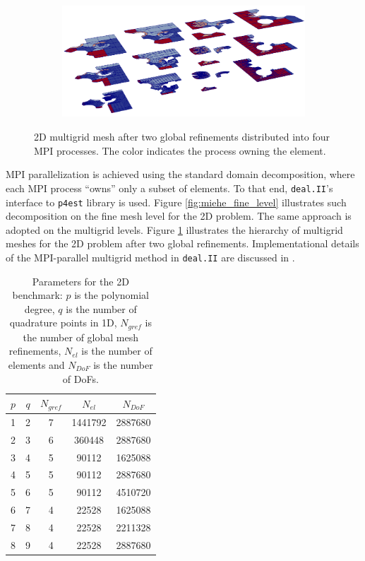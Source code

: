 \documentclass[times,doublespace]{nmeauth}
\begin{document}
\begin{figure}[!ht]
  \centering
  \begin{subfigure}[b]{0.8\textwidth}
    \centering
    \includegraphics[width=\textwidth]{gmg_2d_4procs.png}
  \end{subfigure}
  \caption{2D multigrid mesh after two global refinements distributed into four MPI processes. The color indicates the process owning the element.}%
  \label{fig:miehe_gmg}
\end{figure}
%
%
{\color{red}
MPI parallelization is achieved using the standard domain decomposition, where each MPI process ``owns'' only a subset of elements.
To that end, \texttt{deal.II}'s interface to \texttt{p4est} \cite{p4est} library is used.
Figure \ref{fig:miehe_fine_level} illustrates such decomposition on the fine mesh level for the 2D problem.
The same approach is adopted on the multigrid levels.}
Figure \ref{fig:miehe_gmg} illustrates the hierarchy of multigrid meshes for the 2D problem after two global refinements.
{\color{red}
Implementational details of the MPI-parallel multigrid method in \texttt{deal.II} are discussed in \cite{Clevenger2018}.
}

\begin{table}
  \centering
  \begin{tabular}{ccccc}
  \hline
    $p$ & $q$ & $N_{gref}$ & $N_{el}$ & $N_{DoF}$ \\
  \hline
    1 & 2 & 7 & 1441792 & 2887680 \\
    2 & 3 & 6 & 360448 & 2887680 \\
    3 & 4 & 5 & 90112 & 1625088 \\
    4 & 5 & 5 & 90112 & 2887680 \\
    5 & 6 & 5 & 90112 & 4510720 \\
    6 & 7 & 4 & 22528 & 1625088 \\
    7 & 8 & 4 & 22528 & 2211328 \\
    8 & 9 & 4 & 22528 & 2887680 \\
  \hline
  \end{tabular}
  \caption{Parameters for the 2D benchmark: $p$ is the polynomial degree,
  $q$ is the number of quadrature points in 1D, $N_{gref}$ is the number of global mesh refinements, $N_{el}$ is the number of elements and $N_{DoF}$ is the number of DoFs.
  }
  \label{tab:input_parameters_2d}
\end{table}
\end{document}
